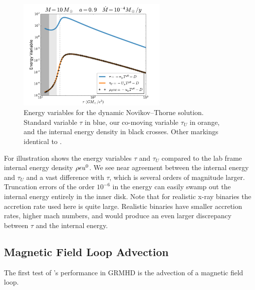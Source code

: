 \begin{figure}
\begin{center}
	\includegraphics[width=0.65\textwidth]{figures/numerics/nt_eps.pdf}
\end{center}
\caption{Energy variables for the dynamic Novikov--Thorne solution. Standard variable $\tau$ in blue, our co-moving variable $\tau_U$ in orange, and the internal energy density in black crosses.  Other markings identical to .  }
\end{figure}

For illustration  shows the energy variables $\tau$ and $\tau_U$ compared to the lab frame internal energy density $\rho \epsilon u^0$.  We see near agreement between the internal energy and $\tau_U$ and a vast difference with $\tau$, which is several orders of magnitude larger.  Truncation errors of the order $10^{-6}$ in the energy can easily swamp out the internal energy entirely in the inner disk.  Note that for realistic x-ray binaries the accretion rate used here is quite large.  Realistic binaries have smaller accretion rates, higher mach numbers, and would produce an even larger discrepancy between $\tau$ and the internal energy.  

\subsection{Magnetic Field Loop Advection}

The first test of \grdisco's performance in GRMHD is the advection of a magnetic field loop.


